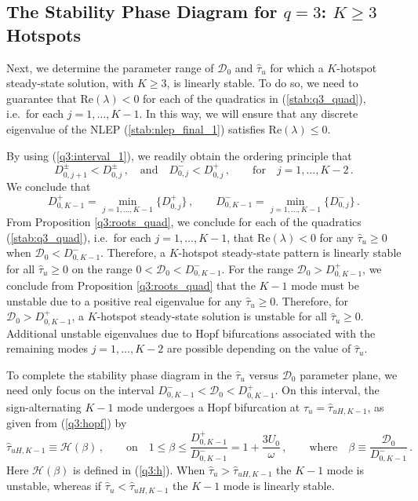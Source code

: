\documentclass{article}%
\begin{document}
\subsection{The Stability Phase Diagram for $q=3$: $K\geq 3$ Hotspots}
\label{sect:q3_phase}

Next, we determine the parameter range of ${\mathcal D}_0$ and
$\hat{\tau}_u$ for which a $K$-hotspot steady-state solution, with
$K\geq 3$, is linearly stable. To do so, we need to guarantee that
$\mbox{Re}(\lambda)<0$ for each of the quadratics in
(\ref{stab:q3_quad}), i.e.~for each $j=1,\ldots,K-1$. In this way, we will
ensure that any discrete eigenvalue of the NLEP
(\ref{stab:nlep_final_1}) satisfies $\mbox{Re}(\lambda)\leq 0$.

By using (\ref{q3:interval_1}), we readily obtain the ordering principle that
\begin{equation}\label{q3:d_order}
    D^{\pm}_{0,j+1} < D^{\pm}_{0,j} \,, \quad \mbox{and} \quad
    D^{-}_{0,j} < D^{+}_{0,j} \,, \qquad \mbox{for} \quad j=1,\ldots,K-2 \,.
\end{equation}
We conclude that 
\begin{equation}\label{q3:d_order_1}
    D^{+}_{0,K-1} = \min_{j=1,\ldots,K-1} \lbrace{ D^{+}_{0,j} \rbrace} \,,
    \qquad 
    D^{-}_{0,K-1} = \min_{j=1,\ldots,K-1} \lbrace{ D^{-}_{0,j} \rbrace} \,.
\end{equation}
From Proposition \ref{q3:roots_quad}, we conclude for each of the
quadratics (\ref{stab:q3_quad}), i.e.~for each $j=1,\ldots,K-1$, that
$\mbox{Re}(\lambda)<0$ for any $\hat{\tau}_u\geq 0$ when ${\mathcal
  D}_0<D^{-}_{0,K-1}$. Therefore, a $K$-hotspot steady-state pattern
is linearly stable for all $\hat{\tau}_u\geq 0$ on the range
$0<{\mathcal D}_0<D^{-}_{0,K-1}$. For the range ${\mathcal
  D}_0>D^{+}_{0,K-1}$, we conclude from Proposition
\ref{q3:roots_quad} that the $K-1$ mode must be unstable due to a
positive real eigenvalue for any $\hat{\tau}_u\geq 0$.  Therefore, for
${\mathcal D}_0>D^{+}_{0,K-1}$, a $K$-hotspot steady-state solution is
unstable for all $\hat{\tau}_u\geq 0$.  Additional unstable
eigenvalues due to Hopf bifurcations associated with the remaining modes
$j=1,\ldots,K-2$ are possible depending on the value of
$\hat{\tau}_u$.

To complete the stability phase diagram in the $\hat{\tau}_u$ versus 
${\mathcal D}_0$ parameter plane, we need only focus on the interval
$D^{-}_{0,K-1}<{\mathcal D}_0<D^{+}_{0,K-1}$. On this interval, the 
sign-alternating $K-1$ mode undergoes a Hopf bifurcation at 
$\hat{\tau}_u=\hat{\tau}_{uH,K-1}$, as given from (\ref{q3:hopf}) by
\begin{equation}\label{q3:hopf_K-1}
     \hat{\tau}_{uH,K-1} \equiv {\mathcal H}\left(\beta\right) \,,
     \qquad \mbox{on} \quad 1\leq \beta \leq
     \frac{D^{+}_{0,K-1}}{D^{-}_{0,K-1}} = 1+ \frac{3U_0}{\omega} \,,
     \qquad \mbox{where} \quad \beta \equiv \frac{{\mathcal
         D}_0}{D^{-}_{0,K-1}} \,.
\end{equation}
Here ${\mathcal H}(\beta)$ is defined in (\ref{q3:h}).  When
$\hat{\tau}_u>\hat{\tau}_{uH,K-1}$ the $K-1$ mode is unstable, whereas
if $\hat{\tau}_u<\hat{\tau}_{uH,K-1}$ the $K-1$ mode is linearly
stable.
\end{document}
